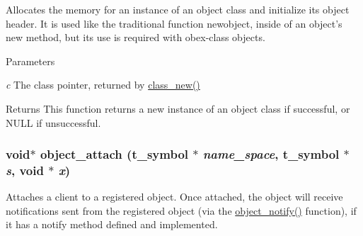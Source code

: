 Allocates the memory for an instance of an object class and initialize its object header. It is used like the traditional function newobject, inside of an object's {\ttfamily new} method, but its use is required with obex-\/class objects.


\begin{DoxyParams}{Parameters}
\item[{\em c}]The class pointer, returned by \hyperlink{group__class_ga238696d466081965c2b72b3880358404}{class\_\-new()} \end{DoxyParams}
\begin{DoxyReturn}{Returns}
This function returns a new instance of an object class if successful, or NULL if unsuccessful. 
\end{DoxyReturn}
\hypertarget{group__obj_ga42025069e4317aef6dbe5c21c316fd85}{
\subsubsection[{object\_\-attach}]{\setlength{\rightskip}{0pt plus 5cm}void$\ast$ object\_\-attach ({\bf t\_\-symbol} $\ast$ {\em name\_\-space}, \/  {\bf t\_\-symbol} $\ast$ {\em s}, \/  void $\ast$ {\em x})}}
\label{group__obj_ga42025069e4317aef6dbe5c21c316fd85}


Attaches a client to a registered object. Once attached, the object will receive notifications sent from the registered object (via the \hyperlink{group__obj_ga6297b81c3a70f7fb2201c7262e96bba3}{object\_\-notify()} function), if it has a {\ttfamily notify} method defined and implemented.


